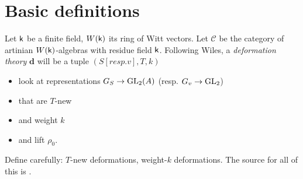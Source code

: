 \documentclass[phd,cornellheadings,draft]{cornell}
\begin{document}
\section{Basic definitions}

Let $\mathsf{k}$ be a finite field, $W(\mathsf{k})$ its ring of Witt vectors. Let 
$\mathcal{C}$ be the category of artinian $W(\mathsf{k})$-algebras with residue field 
$\mathsf{k}$. Following Wiles, a \emph{deformation theory} $\boldsymbol d$ will be a 
tuple $(S [resp.v],T,k)$
\begin{itemize}
  \item look at representations $G_S\to \operatorname{GL}_2(A)$ (resp. $G_v\to \operatorname{GL}_2$)
  \item that are $T$-new
  \item and weight $k$
  \item and lift $\rho_0$. 
\end{itemize}
Define carefully: $T$-new deformations, weight-$k$ deformations. The source for 
all of this is \cite{mazur-1995}. 





\printbibliography
\end{document}
